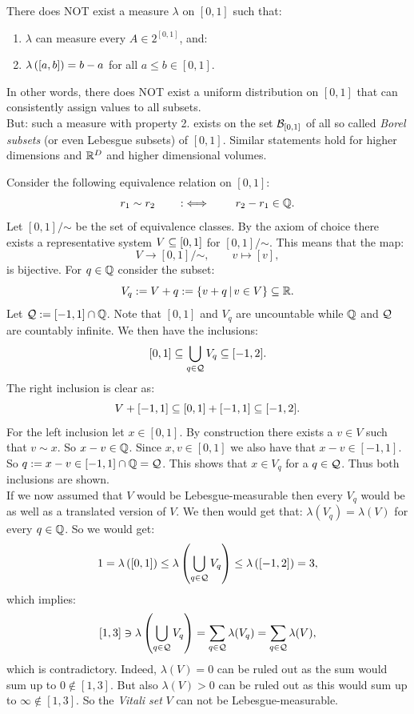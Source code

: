 \begin{Thm}%
   \label{thm-non-lebesgue}
    There does NOT exist a measure $\lambda$ on $[0,1]$ such that:
    \begin{enumerate}
        \item $\lambda$ can measure every $A \in 2^{[0,1]}$, and:
        \item $\lambda\left ([a,b] \right ) = b-a$ for all $a\le b \in [0,1]$.
    \end{enumerate}
    In other words, there does NOT exist a uniform distribution on $[0,1]$ that can consistently assign values to all subsets.\\
    But: such a measure with property 2. exists on the set $\mathcal{B}_{[0,1]}$ of all so called \emph{Borel subsets} (or even Lebesgue subsets) 
    of $[0,1]$.
    Similar statements hold for higher dimensions and $\mathbb{R}^D$ and higher dimensional volumes.
\end{Thm}

\begin{Eg}
    Consider the following equivalence relation on $[0,1]$:
    \[ r_1 \sim r_2 \qquad :\iff \qquad r_2-r_1 \in \mathbb{Q}.\]
    Let $[0,1]/\mathord{\sim}$ be the set of equivalence classes.
    By the axiom of choice there exists a representative system $V \subseteq [0,1]$ for $[0,1]/\mathord{\sim}$.
    This means that the map:
    \[ V \to [0,1]/\mathord{\sim}, \qquad v \mapsto [v],\]
    is bijective. For $q \in \mathbb{Q}$ consider the subset:
    \[V_q :=  V+q := \left \{ v + q \,|\, v \in V \right \}  \subseteq \mathbb{R}. \]
    Let $\mathcal{Q} := [-1,1] \cap \mathbb{Q}$.  Note that $[0,1]$ and $V_q$ are uncountable while $\mathbb{Q}$ and $\mathcal{Q}$ are countably infinite. 
    We then have the inclusions:
    \[ [0,1] \subseteq  \bigcup_{ q \in \mathcal{Q}} V_q \subseteq [-1,2].\]
    The right inclusion is clear as:
     \[V + [-1,1] \subseteq [0,1]+[-1,1] \subseteq [-1,2].\]
    For the left inclusion let $ x\in [0,1]$. By construction there exists a $v \in V$ such that $v \sim x$. 
    So $x - v \in \mathbb{Q}$. Since $x,v \in [0,1]$ we also have that $x-v \in [-1,1]$. So $q := x-v \in [-1,1] \cap \mathbb{Q} =\mathcal{Q}$.
    This shows that $ x \in V_q$ for a $q \in \mathcal{Q}$. Thus both inclusions are shown.\\
    If we now assumed that $V$ would be Lebesgue-measurable then every $V_q$ would be as well as a translated version of $V$.
    We then would get that: $\lambda(V_q) = \lambda(V)$ for every $q\in \mathbb{Q}$. So we would get:
    \[ 1 = \lambda \left ([0,1]\right ) \le \lambda\left (\bigcup_{ q \in \mathcal{Q}} V_q \right )   \le \lambda \left ([-1,2]\right ) =3  ,\]
    which implies:
    \[ [1,3] \ni \lambda\left (\bigcup_{ q \in \mathcal{Q}} V_q \right ) = \sum_{ q\in \mathcal{Q}} \lambda(V_q) = 
    \sum_{ q\in \mathcal{Q}} \lambda(V), \]
    which is contradictory. Indeed, $\lambda(V) =0$ can be ruled out as the sum would sum up to $0 \notin [1,3]$.
    But also $\lambda(V)>0$ can be ruled out as this would sum up to $\infty \notin [1,3]$.
    So the \emph{Vitali set} $V$ can not be Lebesgue-measurable.
\end{Eg}




